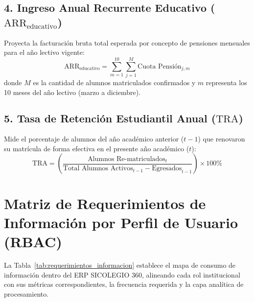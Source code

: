 \documentclass[12pt,a4paper,oneside]{report}
\begin{document}
\subsection{4. Ingreso Anual Recurrente Educativo ($\text{ARR}_{\text{educativo}}$)}
Proyecta la facturación bruta total esperada por concepto de pensiones mensuales para el año lectivo vigente:
\begin{equation}
\text{ARR}_{\text{educativo}} = \sum_{m=1}^{10} \sum_{j=1}^{M} \text{Cuota Pensión}_{j,m}
\end{equation}
donde $M$ es la cantidad de alumnos matriculados confirmados y $m$ representa los 10 meses del año lectivo (marzo a diciembre).

\subsection{5. Tasa de Retención Estudiantil Anual ($\text{TRA}$)}
Mide el porcentaje de alumnos del año académico anterior ($t-1$) que renovaron su matrícula de forma efectiva en el presente año académico ($t$):
\begin{equation}
\text{TRA} = \left( \frac{\text{Alumnos Re-matriculados}_t}{\text{Total Alumnos Activos}_{t-1} - \text{Egresados}_{t-1}} \right) \times 100\%
\end{equation}

\section{Matriz de Requerimientos de Información por Perfil de Usuario (RBAC)}

La Tabla~\ref{tab:requerimientos_informacion} establece el mapa de consumo de información dentro del ERP SICOLEGIO 360, alineando cada rol institucional con sus métricas correspondientes, la frecuencia requerida y la capa analítica de procesamiento.
\end{document}
